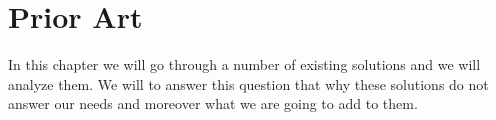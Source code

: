 \chapter{Prior Art}
In this chapter we will go through a number of existing solutions and we will analyze them.
We will to answer this question that why these solutions do not answer our needs and moreover what we are going
to add to them.